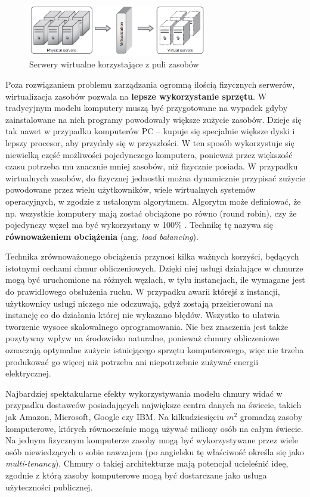 \documentclass[12pt,a4paper,twoside,titlepage,openright]{book}
\begin{document}
\begin{figure}[h]
	\centering
			\includegraphics[width=0.7\textwidth]{pooling.png}
		\caption{Serwery wirtualne korzystające z puli zasobów \cite{ccCambridge}}
		\label{fig:pooling}
\end{figure}

Poza rozwiązaniem problemu zarządzania ogromną ilością fizycznych serwerów, wirtualizacja zasobów pozwala na \textbf{lepsze wykorzystanie sprzętu}. W tradycyjnym modelu komputery muszą być przygotowane na wypadek gdyby zainstalowane na nich programy powodowały większe zużycie zasobów. Dzieje się tak nawet w przypadku komputerów PC -- kupuje się specjalnie większe dyski i lepszy procesor, aby przydały się w przyszłości. W ten sposób wykorzystuje się niewielką część możliwości pojedynczego komputera, ponieważ przez większość czasu potrzeba mu znacznie mniej zasobów, niż fizycznie posiada. W przypadku wirtualnych zasobów, do fizycznej jednostki można dynamicznie przypisać zużycie powodowane przez wielu użytkowników, wiele wirtualnych systemów operacyjnych, w zgodzie z ustalonym algorytmem. Algorytm może definiować, że np. wszystkie komputery mają zostać obciążone po równo (round robin), czy że pojedynczy węzeł ma być wykorzystany w 100\% \cite{cloudFoundry}. Technikę tę nazywa się \textbf{równoważeniem obciążenia} (ang. \textit{load balancing}).

Technika zrównoważonego obciążenia przynosi kilka ważnych korzyści, będących istotnymi cechami chmur obliczeniowych. Dzięki niej usługi działające w chmurze mogą być uruchomione na różnych węzłach, w tylu instancjach, ile wymagane jest do prawidłowego obsłużenia ruchu. W przypadku awarii którejś z instancji, użytkownicy usługi niczego nie odczuwają, gdyż zostają przekierowani na instancję co do działania której nie wykazano błędów. Wszystko to ułatwia tworzenie wysoce skalowalnego oprogramowania. Nie bez znaczenia jest także pozytywny wpływ na środowisko naturalne, ponieważ chmury obliczeniowe oznaczają optymalne zużycie istniejącego sprzętu komputerowego, więc nie trzeba produkować go więcej niż potrzeba ani niepotrzebnie zużywać energii elektrycznej.

Najbardziej spektakularne efekty wykorzystywania modelu chmury widać w przypadku dostawców posiadających największe centra danych na świecie, takich jak Amazon, Microsoft, Google czy IBM. Na kilkudziesięciu $m^{2}$ gromadzą zasoby komputerowe, których równocześnie mogą używać miliony osób na całym świecie. Na jednym fizycznym komputerze zasoby mogą być wykorzystywane przez wiele osób niewiedzących o sobie nawzajem (po angielsku tę właściwość określa się jako \textit{multi-tenancy}). Chmury o takiej architekturze mają potencjał ucieleśnić ideę, zgodnie z którą zasoby komputerowe mogą być dostarczane jako usługa użyteczności publicznej.
\end{document}

